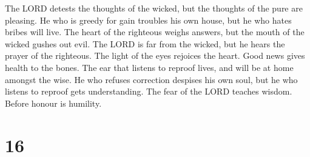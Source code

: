  The LORD detests the thoughts of the wicked, but the
thoughts of the pure are pleasing.  He who is greedy for
gain troubles his own house, but he who hates bribes will live.
 The heart of the righteous weighs answers, but the mouth
of the wicked gushes out evil.  The LORD is far from the
wicked, but he hears the prayer of the righteous.  The
light of the eyes rejoices the heart. Good news gives health to the
bones.  The ear that listens to reproof lives, and will
be at home amongst the wise.  He who refuses correction
despises his own soul, but he who listens to reproof gets understanding.
 The fear of the LORD teaches wisdom. Before honour is
humility.

\hypertarget{section-15}{%
\section{16}\label{section-15}}


